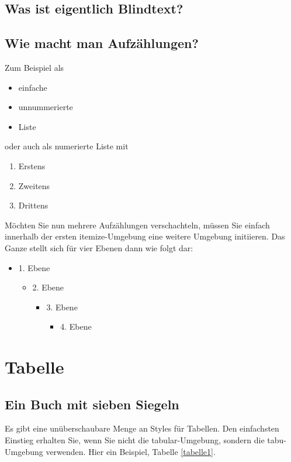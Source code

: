 \subsection{Was ist eigentlich Blindtext?}

\blindtext
\subsection{Wie macht man Aufzählungen?}
Zum Beispiel als
\begin{itemize}
\item einfache
\item unnummerierte
\item Liste
\end{itemize}

oder auch als numerierte Liste mit
\begin{enumerate}
\item Erstens
\item Zweitens 
\item Drittens
\end{enumerate}

Möchten Sie nun mehrere Aufzählungen verschachteln, müssen Sie einfach innerhalb der ersten itemize-Umgebung eine weitere Umgebung initiieren. Das Ganze stellt sich für vier Ebenen dann wie folgt dar:

\begin{itemize}
\item 1. Ebene
\begin{itemize}
\item 2. Ebene
\begin{itemize}
\item 3. Ebene
\begin{itemize}
\item 4. Ebene
\end{itemize}
\end{itemize}
\end{itemize}
\end{itemize}


\section{Tabelle}
\subsection{Ein Buch mit sieben Siegeln}

Es gibt eine unüberschaubare Menge an Styles für Tabellen. Den einfachsten Einstieg erhalten Sie, wenn Sie nicht die tabular-Umgebung, sondern die tabu-Umgebung verwenden. Hier ein Beispiel, Tabelle \ref{tabelle1}.


